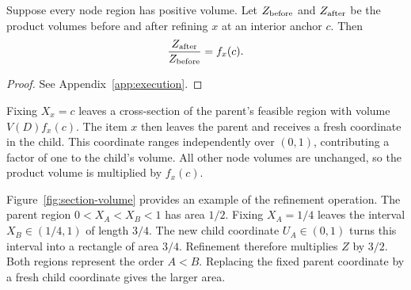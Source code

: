 \begin{samepage}
\begin{lemma}\label{lem:section-volume}
Suppose every node region has positive volume. Let $Z_{\rm before}$ and
$Z_{\rm after}$ be the product volumes before and after refining $x$ at an
interior anchor $c$. Then
\begin{equation}\label{eq:refine}
\frac{Z_{\rm after}}{Z_{\rm before}}=f_x(c).
\end{equation}
\end{lemma}
\begin{proof}
See Appendix~\ref{app:execution}.
\end{proof}
\end{samepage}

\begin{samepage}
Fixing $X_x=c$ leaves a cross-section of the parent's feasible region
with volume $V(D)f_x(c)$. The item $x$ then leaves the parent and receives
a fresh coordinate in the child. This coordinate ranges independently
over $(0,1)$, contributing a factor of one to the child's volume.
All other node volumes are unchanged, so the product volume is
multiplied by $f_x(c)$.

\end{samepage}

\begin{samepage}
Figure~\ref{fig:section-volume} provides an example of the refinement operation.
The parent region $0<X_A<X_B<1$ has area $1/2$. Fixing
$X_A=1/4$ leaves the interval $X_B\in(1/4,1)$ of length $3/4$. The new
child coordinate $U_A\in(0,1)$ turns this interval into a rectangle of
area $3/4$. Refinement therefore multiplies $Z$ by $3/2$.
Both regions represent the order $A<B$. Replacing the fixed parent
coordinate by a fresh child coordinate gives the larger area.

\end{samepage}

